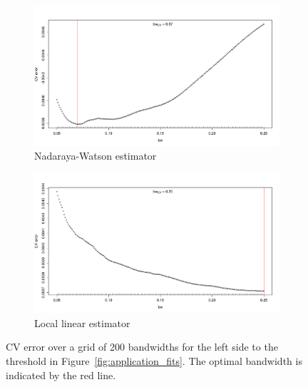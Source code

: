 \documentclass[a4paper, 12pt]{scrartcl}
\begin{document}
\begin{figure}
	\centering
	\begin{subfigure}{\textwidth}
		\centering
		\includegraphics[trim=0 0 20 45, clip, width=\textwidth]{application_figure_03a.pdf}
		\caption{Nadaraya-Watson estimator}
		\label{fig:application_left_nw}
	\end{subfigure}

	\begin{subfigure}{\textwidth}
		\centering
		\includegraphics[trim=0 0 20 40, clip, width=\textwidth]{application_figure_03b.pdf}
		\caption{Local linear estimator}
		\label{fig:application_left_ll}
	\end{subfigure}
	\caption{CV error over a grid of 200 bandwidths for the left side to the threshold in Figure~\ref{fig:application_fits}.
			 The optimal bandwidth is indicated by the red line.}
	\label{fig:application_left}
\end{figure}
\end{document}
